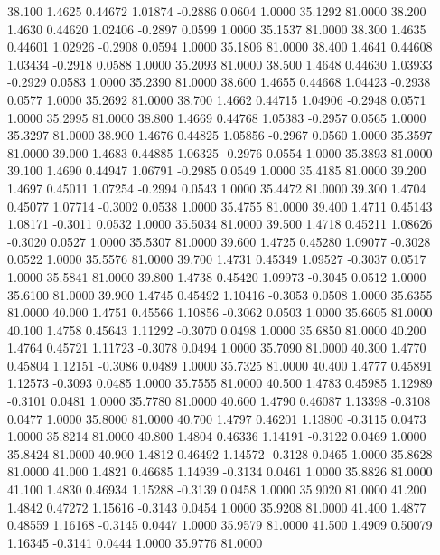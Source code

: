   38.100   1.4625   0.44672   1.01874  -0.2886   0.0604   1.0000  35.1292  81.0000
  38.200   1.4630   0.44620   1.02406  -0.2897   0.0599   1.0000  35.1537  81.0000
  38.300   1.4635   0.44601   1.02926  -0.2908   0.0594   1.0000  35.1806  81.0000
  38.400   1.4641   0.44608   1.03434  -0.2918   0.0588   1.0000  35.2093  81.0000
  38.500   1.4648   0.44630   1.03933  -0.2929   0.0583   1.0000  35.2390  81.0000
  38.600   1.4655   0.44668   1.04423  -0.2938   0.0577   1.0000  35.2692  81.0000
  38.700   1.4662   0.44715   1.04906  -0.2948   0.0571   1.0000  35.2995  81.0000
  38.800   1.4669   0.44768   1.05383  -0.2957   0.0565   1.0000  35.3297  81.0000
  38.900   1.4676   0.44825   1.05856  -0.2967   0.0560   1.0000  35.3597  81.0000
  39.000   1.4683   0.44885   1.06325  -0.2976   0.0554   1.0000  35.3893  81.0000
  39.100   1.4690   0.44947   1.06791  -0.2985   0.0549   1.0000  35.4185  81.0000
  39.200   1.4697   0.45011   1.07254  -0.2994   0.0543   1.0000  35.4472  81.0000
  39.300   1.4704   0.45077   1.07714  -0.3002   0.0538   1.0000  35.4755  81.0000
  39.400   1.4711   0.45143   1.08171  -0.3011   0.0532   1.0000  35.5034  81.0000
  39.500   1.4718   0.45211   1.08626  -0.3020   0.0527   1.0000  35.5307  81.0000
  39.600   1.4725   0.45280   1.09077  -0.3028   0.0522   1.0000  35.5576  81.0000
  39.700   1.4731   0.45349   1.09527  -0.3037   0.0517   1.0000  35.5841  81.0000
  39.800   1.4738   0.45420   1.09973  -0.3045   0.0512   1.0000  35.6100  81.0000
  39.900   1.4745   0.45492   1.10416  -0.3053   0.0508   1.0000  35.6355  81.0000
  40.000   1.4751   0.45566   1.10856  -0.3062   0.0503   1.0000  35.6605  81.0000
  40.100   1.4758   0.45643   1.11292  -0.3070   0.0498   1.0000  35.6850  81.0000
  40.200   1.4764   0.45721   1.11723  -0.3078   0.0494   1.0000  35.7090  81.0000
  40.300   1.4770   0.45804   1.12151  -0.3086   0.0489   1.0000  35.7325  81.0000
  40.400   1.4777   0.45891   1.12573  -0.3093   0.0485   1.0000  35.7555  81.0000
  40.500   1.4783   0.45985   1.12989  -0.3101   0.0481   1.0000  35.7780  81.0000
  40.600   1.4790   0.46087   1.13398  -0.3108   0.0477   1.0000  35.8000  81.0000
  40.700   1.4797   0.46201   1.13800  -0.3115   0.0473   1.0000  35.8214  81.0000
  40.800   1.4804   0.46336   1.14191  -0.3122   0.0469   1.0000  35.8424  81.0000
  40.900   1.4812   0.46492   1.14572  -0.3128   0.0465   1.0000  35.8628  81.0000
  41.000   1.4821   0.46685   1.14939  -0.3134   0.0461   1.0000  35.8826  81.0000
  41.100   1.4830   0.46934   1.15288  -0.3139   0.0458   1.0000  35.9020  81.0000
  41.200   1.4842   0.47272   1.15616  -0.3143   0.0454   1.0000  35.9208  81.0000
  41.400   1.4877   0.48559   1.16168  -0.3145   0.0447   1.0000  35.9579  81.0000
  41.500   1.4909   0.50079   1.16345  -0.3141   0.0444   1.0000  35.9776  81.0000
